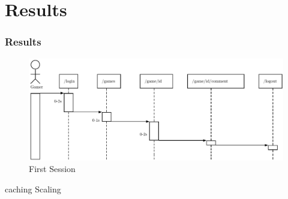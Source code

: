 \section{Results}
\begin{frame}
\frametitle{Results}
\begin{figure}[h]
	\centering
	\includegraphics[width=1\textwidth, height=0.5\textheight]{images/generic-1.pdf}
	\caption{First Session}\label{fig:sqlopt}
\end{figure}
\end{frame}





 {caching}
 {Scaling}
